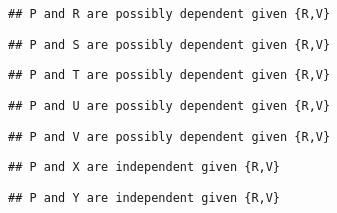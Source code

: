 \documentclass[
]{article}
\newenvironment{Shaded}{\begin{snugshade}}{\end{snugshade}}
\newcommand{\ControlFlowTok}[1]{\textcolor[rgb]{0.13,0.29,0.53}{\textbf{#1}}}
\newcommand{\DecValTok}[1]{\textcolor[rgb]{0.00,0.00,0.81}{#1}}
\newcommand{\FunctionTok}[1]{\textcolor[rgb]{0.00,0.00,0.00}{#1}}
\newcommand{\NormalTok}[1]{#1}
\newcommand{\OtherTok}[1]{\textcolor[rgb]{0.56,0.35,0.01}{#1}}
\newcommand{\SpecialCharTok}[1]{\textcolor[rgb]{0.00,0.00,0.00}{#1}}
\newcommand{\StringTok}[1]{\textcolor[rgb]{0.31,0.60,0.02}{#1}}
\begin{document}
\begin{Shaded}
\end{Shaded}

\begin{verbatim}
## P and R are possibly dependent given {R,V}
\end{verbatim}

\begin{verbatim}
## P and S are possibly dependent given {R,V}
\end{verbatim}

\begin{verbatim}
## P and T are possibly dependent given {R,V}
\end{verbatim}

\begin{verbatim}
## P and U are possibly dependent given {R,V}
\end{verbatim}

\begin{verbatim}
## P and V are possibly dependent given {R,V}
\end{verbatim}

\begin{verbatim}
## P and X are independent given {R,V}
\end{verbatim}

\begin{verbatim}
## P and Y are independent given {R,V}
\end{verbatim}
\end{document}
